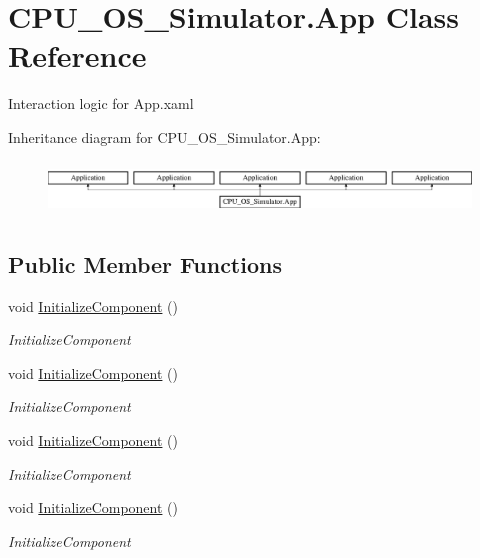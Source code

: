 \hypertarget{class_c_p_u___o_s___simulator_1_1_app}{}\section{C\+P\+U\+\_\+\+O\+S\+\_\+\+Simulator.\+App Class Reference}
\label{class_c_p_u___o_s___simulator_1_1_app}


Interaction logic for App.\+xaml  


Inheritance diagram for C\+P\+U\+\_\+\+O\+S\+\_\+\+Simulator.\+App\+:\begin{figure}[H]
\begin{center}
\leavevmode
\includegraphics[height=1.435897cm]{class_c_p_u___o_s___simulator_1_1_app}
\end{center}
\end{figure}
\subsection*{Public Member Functions}
\begin{DoxyCompactItemize}
\item 
void \hyperlink{class_c_p_u___o_s___simulator_1_1_app_a15e2e0e02c8dbe7d5d3fba5d21f3e56f}{Initialize\+Component} ()
\begin{DoxyCompactList}\small\item\em Initialize\+Component \end{DoxyCompactList}\item 
void \hyperlink{class_c_p_u___o_s___simulator_1_1_app_a15e2e0e02c8dbe7d5d3fba5d21f3e56f}{Initialize\+Component} ()
\begin{DoxyCompactList}\small\item\em Initialize\+Component \end{DoxyCompactList}\item 
void \hyperlink{class_c_p_u___o_s___simulator_1_1_app_a15e2e0e02c8dbe7d5d3fba5d21f3e56f}{Initialize\+Component} ()
\begin{DoxyCompactList}\small\item\em Initialize\+Component \end{DoxyCompactList}\item 
void \hyperlink{class_c_p_u___o_s___simulator_1_1_app_a15e2e0e02c8dbe7d5d3fba5d21f3e56f}{Initialize\+Component} ()
\begin{DoxyCompactList}\small\item\em Initialize\+Component \end{DoxyCompactList}\end{DoxyCompactItemize}
